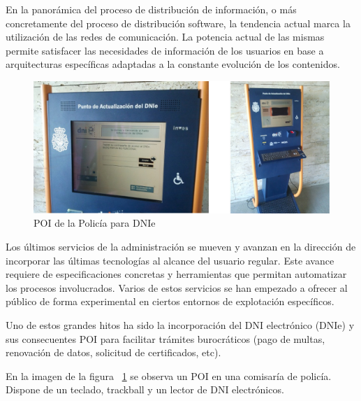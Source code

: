 En la panorámica del proceso de distribución de información, o más concretamente
del proceso de distribución software, la tendencia actual marca la utilización
de las redes de comunicación\cite{Ver02}.
La potencia actual de las mismas permite satisfacer las necesidades de
información de los usuarios en base a arquitecturas específicas adaptadas a la
constante evolución de los contenidos.~\\

\begin{figure}[ht]
    \begin{center}
        \includegraphics[width=425px]{src/img/front-poi-dni-combined.jpg}
        \caption[POI de la Policía para DNIe]{POI de la Policía para DNIe}
        \label{fig:POIDNI}
    \end{center}
\end{figure}

Los últimos servicios de la administración se mueven y avanzan en la dirección
de incorporar las últimas tecnologías al alcance del usuario regular. Este
avance requiere de especificaciones concretas y herramientas que permitan
automatizar los procesos involucrados. Varios de estos servicios se han 
empezado a ofrecer al público de forma experimental en ciertos entornos de
explotación específicos.

Uno de estos grandes hitos ha sido la incorporación del DNI electrónico (DNIe) y
sus consecuentes POI para facilitar trámites burocráticos (pago de multas,
renovación de datos, solicitud de certificados, etc).

En la imagen de la figura ~\ref{fig:POIDNI} se observa un POI en una comisaría
de policía. Dispone de un teclado, trackball y un lector de DNI electrónicos.

